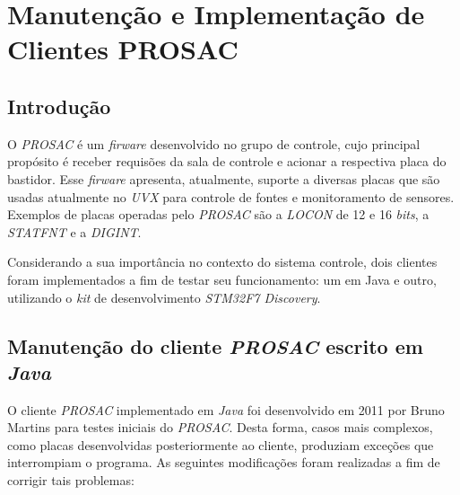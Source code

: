 \section {Manutenção e Implementação de Clientes PROSAC}

\subsection{Introdução}

O \textit{PROSAC} é um \textit{firware} desenvolvido no grupo de controle, cujo
principal propósito é receber requisões da sala de controle e acionar a
respectiva placa do bastidor. Esse \textit{firware} apresenta, atualmente,
suporte a diversas placas que são usadas atualmente no \textit{UVX} para
controle de fontes e monitoramento de sensores. Exemplos de placas operadas pelo
\textit{PROSAC} são a \textit{LOCON} de 12 e 16 \textit{bits}, a
\textit{STATFNT} e a \textit{DIGINT}.

\vspace{12px}

Considerando a sua importância no contexto do sistema controle, dois clientes
foram implementados a fim de testar seu funcionamento: um em Java e outro,
utilizando o \textit{kit} de desenvolvimento \textit{STM32F7 Discovery}.

\subsection {Manutenção do cliente \textit{PROSAC} escrito em \textit{Java}}

O cliente \textit{PROSAC} implementado em \textit{Java} foi desenvolvido em 2011
por Bruno Martins para testes iniciais do \textit{PROSAC}. Desta forma, casos mais
complexos, como placas desenvolvidas posteriormente ao cliente, produziam
exceções que interrompiam o programa. As seguintes modificações foram realizadas
a fim de corrigir tais problemas:

